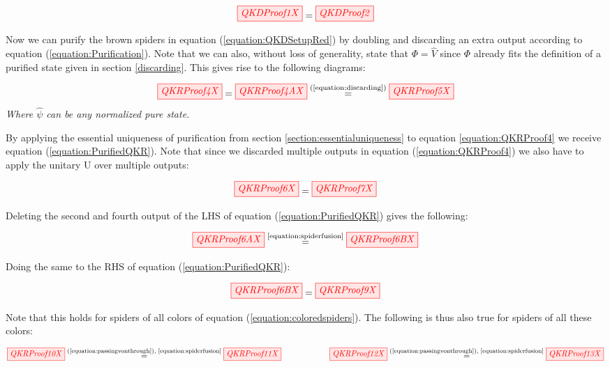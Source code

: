 \documentclass[]{article}
\newcommand{\equaltext}[1]{\ensuremath{\stackrel{\text{#1}}{=}}}
\begin{document}
\begin{equation}
	\label{equation:QKDSetupRed}
	\tikzfig{QKDProof1X} = \tikzfig{QKDProof2}
\end{equation}

Now we can purify the brown spiders in equation (\ref{equation:QKDSetupRed}) by doubling and discarding an extra output according to equation (\ref{equation:Purification}). Note that we can also, without loss of generality, state that $\Phi = \hat{V}$ since $\Phi$ already fits the definition of a purified state given in section \ref{discarding}. This gives rise to the following diagrams:

\begin{equation}
	\label{equation:QKRProof4}
	\tikzfig{QKRProof4X} = \tikzfig{QKRProof4AX} \equaltext{(\ref{equation:discarding})} \tikzfig{QKRProof5X}
\end{equation}
\textit{Where $\hat{\psi}$ can be any normalized pure state.}

By applying the essential uniqueness of purification from section \ref{section:essentialuniqueness} to equation \ref{equation:QKRProof4} we receive equation (\ref{equation:PurifiedQKR}). Note that since we discarded multiple outputs in equation (\ref{equation:QKRProof4}) we also have to apply the unitary U over multiple outputs:

\begin{equation}
	\label{equation:PurifiedQKR}
	\tikzfig{QKRProof6X} = \tikzfig{QKRProof7X}
\end{equation}

Deleting the second and fourth output of the LHS of equation (\ref{equation:PurifiedQKR}) gives the following:

\begin{equation}
	\tikzfig{QKRProof6AX} \equaltext{\ref{equation:spiderfusion}} \tikzfig{QKRProof6BX}
\end{equation}

Doing the same to the RHS of equation (\ref{equation:PurifiedQKR}):

\begin{equation}
	\label{equation:passingvonthrough}
	 \tikzfig{QKRProof6BX} = \tikzfig{QKRProof9X}
\end{equation}

Note that this holds for spiders of all colors of equation (\ref{equation:coloredspiders}). The following is thus also true for spiders of all these colors:

\begin{equation}
\label{equation:vrules}
	\tikzfig{QKRProof10X} \equaltext{(\ref{equation:passingvonthrough}), \ref{equation:spiderfusion}} \tikzfig{QKRProof11X} ~~~~~~~~~~~~~~~~~~ \tikzfig{QKRProof12X} \equaltext{(\ref{equation:passingvonthrough}), \ref{equation:spiderfusion}} \tikzfig{QKRProof13X}
\end{equation}
\end{document}
